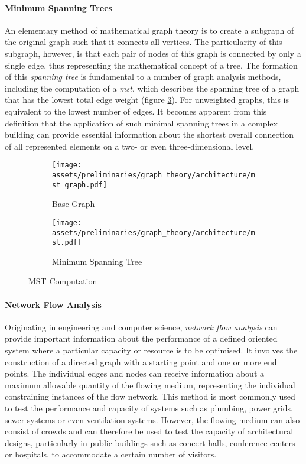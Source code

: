 \documentclass[a4paper, 12pt]{report}
\begin{document}
\paragraph{Minimum Spanning Trees}\label{par:minimum-spanning-trees}

An elementary method of mathematical graph theory is to create a subgraph of the original graph such that it connects all vertices. The particularity of this subgraph, however, is that each pair of nodes of this graph is connected by only a single edge, thus representing the mathematical concept of a tree. The formation of this \textit{spanning tree} is fundamental to a number of graph analysis methods, including the computation of a \textit{\acrlong{mst}}, which describes the spanning tree of a graph that has the lowest total edge weight (figure \ref{fig:mst-of-base-graph}). For unweighted graphs, this is equivalent to the lowest number of edges. It becomes apparent from this definition that the application of such minimal spanning trees in a complex building can provide essential information about the shortest overall connection of all represented elements on a two- or even three-dimensional level.

\begin{figure}
\centering
\begin{subfigure}{.5\textwidth}
\centering
\texttt{[image: assets/preliminaries/graph\_theory/architecture/mst\_graph.pdf]}
\caption{Base Graph}
\label{fig:base-graph}
\end{subfigure}%
\begin{subfigure}{.5\textwidth}
\centering
\texttt{[image: assets/preliminaries/graph\_theory/architecture/mst.pdf]}
\caption{Minimum Spanning Tree}
\label{fig:minimum-spanning-tree}
\end{subfigure}
\caption{MST Computation}
\label{fig:mst-of-base-graph}
\end{figure}

\paragraph{Network Flow Analysis}\label{par:network-flow-analysis}

Originating in engineering and computer science, \textit{network flow analysis} can provide important information about the performance of a defined oriented system where a particular capacity or resource is to be optimised. It involves the construction of a directed graph with a starting point and one or more end points. The individual edges and nodes can receive information about a maximum allowable quantity of the flowing medium, representing the individual constraining instances of the flow network. This method is most commonly used to test the performance and capacity of systems such as plumbing, power grids, sewer systems or even ventilation systems. However, the flowing medium can also consist of crowds and can therefore be used to test the capacity of architectural designs, particularly in public buildings such as concert halls, conference centers or hospitals, to accommodate a certain number of visitors.
\end{document}
